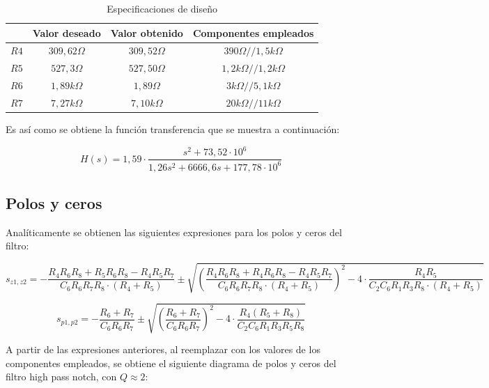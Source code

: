 \begin{table}[H]
	\centering
	\begin{tabular}{c c c c}%
		\bfseries  & Valor deseado & Valor obtenido& Componentes empleados \\ \hline
		$R4$ & $309,62\Omega$  & $309,52\Omega$ & $390\Omega // 1,5k\Omega$\\
		$R5$ & $527,3\Omega$  & $527,50\Omega$ & $1,2k\Omega // 1,2k\Omega$\\
		$R6$ & $1,89k\Omega$  & $1,89\Omega$ & $3k\Omega // 5,1k\Omega$\\
		$R7$ & $7,27k\Omega$  & $7,10k\Omega$ & $20k\Omega // 11k\Omega$\\
		\hline
	\end{tabular}
	\caption{Especificaciones de dise\~no}
	\label{especificaciones}
\end{table}

Es as\'i como se obtiene la funci\'on transferencia que se muestra a continuaci\'on:

\begin{equation}
H(s) = 1,59 \cdot \frac{s^2+73,52 \cdot 10^6}{1,26 s^2 + 6666,6 s + 177,78 \cdot 10^6}
\label{vovi_val}
\end{equation}


\subsection{Polos y ceros}

Anal\'iticamente se obtienen las siguientes expresiones para los polos y ceros del filtro:

\begin{equation}
s_{z1,z2} = - \frac{R_4  R_6  R_8+R_5  R_6  R_8 - R_4 R_5 R_7}{C_6 R_6 R_7 R_8 \cdot (R_4 + R_5)} \pm \sqrt{\left( \frac{R_4 R_6 R_8 + R_4 R_6 R_8 - R_4 R_5 R_7}{C_6 R_6 R_7 R_8 \cdot (R_4 + R_5)}\right)^2- 4 \cdot \frac{R_4 R_5}{C_2 C_6 R_1 R_3 R_8 \cdot (R_4 + R_5)}}
\label{ceros}
\end{equation}

\begin{equation}
s_{p1,p2} = - \frac{R_6 + R_7}{C_6 R_6 R_7} \pm \sqrt{\left( \frac{R_6 + R_7}{C_6 R_6 R_7}\right)^2 - 4 \cdot \frac{R_4(R_5+R_8)}{C_2 C_6 R_1 R_3 R_5 R_8}}
\label{polos}
\end{equation}


A partir de las expresiones anteriores, al reemplazar con los valores de los componentes empleados, se obtiene el siguiente diagrama de polos y ceros del filtro high pass notch, con $Q\approx 2$:

